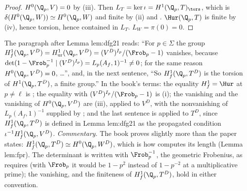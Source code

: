 \begin{proof}
$H^0(\Q_p,V)=0$ by (iii). Then $L_T=\ker\iota=H^1(\Q_p,T)_{\tors}$, which is $\delta(H^0(\Q_p,W))\simeq H^0(\Q_p,W)$ and finite by
(ii) and . $\Hur(\Q_p,T)$ is finite by (iv), hence torsion, hence contained in
$L_T$. $L_W=\pi(0)=0$.
\end{proof}

\begin{paperlink}\label{pl:galcoh:after-dfg21}
The paragraph after Lemma lem:dfg21 reads: ``For $p\in\Sigma$ the group $H^1_f(\Q_p,V^D)=H^1_{\mathrm{ur}}(\Q_p,V^D)=(V^D)^{I_p}/(\Frob_p-1)$
vanishes, because $\det(1-\Frob_p^{-1}\mid(V^D)^{I_p})=L_p(A_f,1)^{-1}\ne0$; for the same reason $H^0(\Q_p,V^D)=0$, \dots'', and, in the next sentence, ``So
$H^1_f(\Q_p,T^D)$ is the torsion of $H^1(\Q_p,T^D)$, a finite group.'' In the book's terms: the equality $H^1_f=\Hur$ at $p\ne\ell$ is ; the
equality with $(V^D)^{I_p}/(\Frob_p-1)$ is (i); the vanishing and the vanishing of $H^0(\Q_p,V^D)$ are
(iii), applied to $V^D$, with the nonvanishing of $L_p(A_f,1)^{-1}$ supplied by ; and the last sentence is
 applied to $T^D$, since $H^1_f(\Q_p,T^D)$ is defined in Lemma lem:dfg21 as the propagated condition $\iota^{-1}H^1_f(\Q_p,V^D)$.
\emph{Commentary.} The book proves slightly more than the paper states: $H^1_f(\Q_p,T^D)\simeq H^0(\Q_p,W^D)$, which is how  computes its length
(Lemma lem:fpr). The determinant is written with $\Frob_p^{-1}$, the geometric Frobenius, as  requires (with $\Frob_p$ it would be $1-p^2$
instead of $1-p^{-2}$ at a multiplicative prime); the vanishing, and the finiteness of $H^1_f(\Q_p,T^D)$, hold in either convention.
\end{paperlink}

